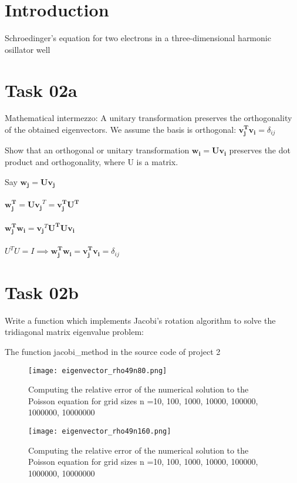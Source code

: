 \section{Introduction}
Schroedinger's equation for two electrons in a three-dimensional harmonic osillator well


\section{Task 02a}
Mathematical intermezzo: A unitary transformation preserves the orthogonality of the obtained eigenvectors. We assume the basis is orthogonal:
$\mathbf{v_j^Tv_i} = \delta_{ij}$

Show that an orthogonal or unitary transformation $\mathbf{w_i} = \mathbf{Uv_i}$ preserves the dot product and orthogonality, where U is a matrix.

Say $\mathbf{w_j} = \mathbf{Uv_j}$\\
\\
$\mathbf{w_j^T} = \mathbf{Uv_j}^T = \mathbf{v_j^TU^T}$\\
\\
$\mathbf{w_j^Tw_i} = \mathbf{v_j}^T \mathbf{U^TUv_i} $\\
\\
$U^TU = I \implies \mathbf{w_j^Tw_i} = \mathbf{v_j^Tv_i} = \delta_{ij}$



\section{Task 02b}
Write a function which implements Jacobi's rotation algorithm to solve the tridiagonal matrix eigenvalue problem:

The function jacobi\_method in the source code of project 2
\FloatBarrier
\begin{figure}[!ht]
\centering
\FloatBarrier
\texttt{[image: eigenvector\_rho49n80.png]}

\caption{Computing the relative error of the numerical solution to the Poisson equation for grid sizes n =10, 100, 1000, 10000, 100000, 1000000, 10000000}
\label{fig:Error_poisson}
\end{figure}
\FloatBarrier



\FloatBarrier
\begin{figure}[!ht]
\centering
\FloatBarrier
\texttt{[image: eigenvector\_rho49n160.png]}

\caption{Computing the relative error of the numerical solution to the Poisson equation for grid sizes n =10, 100, 1000, 10000, 100000, 1000000, 10000000}
\label{fig:Error_poisson}
\end{figure}
\FloatBarrier


